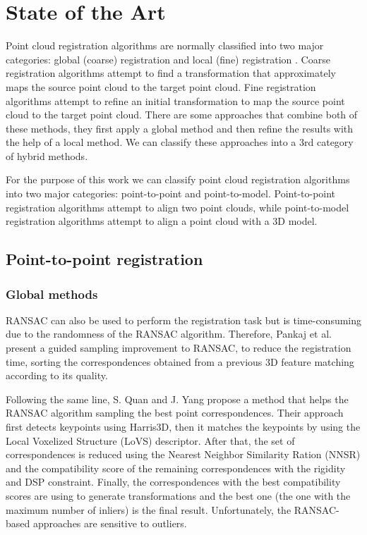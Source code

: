 

    \chapter{State of the Art}
    \label{chap:State of the Art}
    Point cloud registration algorithms are normally classified into two major categories: global (coarse) registration and local (fine) registration \cite{Quan_2020_com,Kim_2011_fully}.
    Coarse registration algorithms attempt to find a transformation that approximately maps the source point cloud to the target point cloud. 
    Fine registration algorithms attempt to refine an initial transformation to map the source point cloud to the target point cloud.
    There are some approaches that combine both of these methods, they first apply a global method and then refine the results with the help of a local method. 
    We can classify these approaches into a 3rd category of hybrid methods. 
    
    \par
    
    For the purpose of this work we can classify point cloud registration algorithms into two major categories:
    point-to-point and point-to-model.
    Point-to-point registration algorithms attempt to align two point clouds, while point-to-model registration algorithms attempt to align a point cloud with a 3D model.

    \section{Point-to-point registration}

        \subsection{Global methods}

        RANSAC \cite{Fischler_1981_RANSAC} can also be used to perform the registration task but is time-consuming due to the randomness
        of the RANSAC algorithm. Therefore, Pankaj et al. \cite{Pankaj_2015_arobust} present a guided sampling improvement to RANSAC,
        to reduce the registration time, sorting the correspondences obtained from a previous 3D feature matching according to its quality.
        
        Following the same line, S. Quan and J. Yang \cite{Quan_2020_com} propose a method that helps the RANSAC algorithm 
        sampling the best point correspondences. Their approach first detects keypoints using Harris3D, then it matches the keypoints
        by using the Local Voxelized Structure (LoVS) descriptor. After that, the set of correspondences is reduced using the 
        Nearest Neighbor Similarity Ration (NNSR) and the compatibility score of the remaining correspondences with the rigidity and 
        DSP constraint. Finally, the correspondences with the best compatibility scores are using to generate transformations and 
        the best one (the one with the maximum number of inliers) is the final result. Unfortunately, the RANSAC-based approaches are sensitive to outliers.


